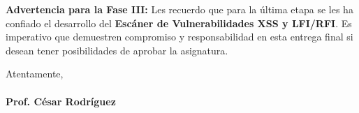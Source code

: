 \documentclass[12pt,letterpaper]{article}
\begin{document}
\vspace{0.3cm}
\noindent \textbf{Advertencia para la Fase III:} Les recuerdo que para la última etapa se les ha confiado el desarrollo del \textbf{Escáner de Vulnerabilidades XSS y LFI/RFI}. Es imperativo que demuestren compromiso y responsabilidad en esta entrega final si desean tener posibilidades de aprobar la asignatura.

\vspace{1cm}
\noindent Atentamente, \\
\vspace{0.5cm} \\
\textbf{Prof. César Rodríguez}
\end{document}
